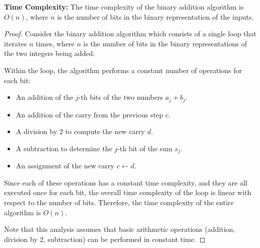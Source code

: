     
    \textbf{Time Complexity:}
    The time complexity of the binary addition algorithm is \( O(n) \), where \( n \) is the number of bits in the binary representation of the inputs.
    \begin{proof}
        Consider the binary addition algorithm which consists of a single loop that iterates \( n \) times, where \( n \) is the number of bits in the binary representations of the two integers being added.
        
        Within the loop, the algorithm performs a constant number of operations for each bit:
        \begin{itemize}
            \item An addition of the \( j \)-th bits of the two numbers \( a_j + b_j \).
            \item An addition of the carry from the previous step \( c \).
            \item A division by 2 to compute the new carry \( d \).
            \item A subtraction to determine the \( j \)-th bit of the sum \( s_j \).
            \item An assignment of the new carry \( c \gets d \).
        \end{itemize}
        
        Since each of these operations has a constant time complexity, and they are all executed once for each bit, the overall time complexity of the loop is linear with respect to the number of bits. Therefore, the time complexity of the entire algorithm is \( O(n) \).
        
        Note that this analysis assumes that basic arithmetic operations (addition, division by 2, subtraction) can be performed in constant time.
        \end{proof}
